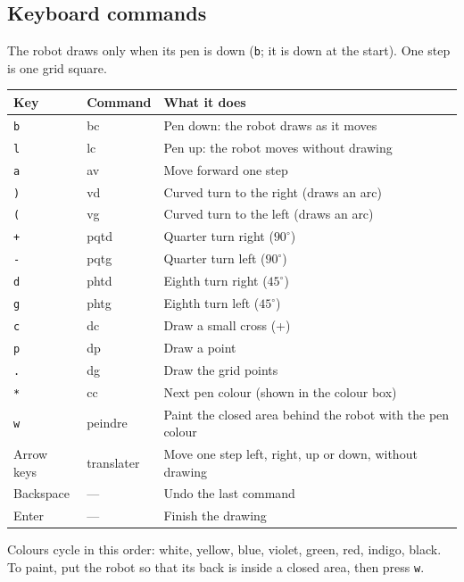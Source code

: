 \documentclass[11pt,a4paper]{article}
\newcommand{\kbd}[1]{\texttt{#1}}
\begin{document}
\subsection{Keyboard commands}
The robot draws only when its pen is down (\kbd{b}; it is down at the
start). One step is one grid square.

\begin{center}
\begin{tabularx}{\linewidth}{@{}l l L@{}}
\toprule
\textbf{Key} & \textbf{Command} & \textbf{What it does} \\
\midrule
\kbd{b} & bc & Pen down: the robot draws as it moves \\
\kbd{l} & lc & Pen up: the robot moves without drawing \\
\kbd{a} & av & Move forward one step \\
\kbd{)} & vd & Curved turn to the right (draws an arc) \\
\kbd{(} & vg & Curved turn to the left (draws an arc) \\
\kbd{+} & pqtd & Quarter turn right ($90^\circ$) \\
\kbd{-} & pqtg & Quarter turn left ($90^\circ$) \\
\kbd{d} & phtd & Eighth turn right ($45^\circ$) \\
\kbd{g} & phtg & Eighth turn left ($45^\circ$) \\
\kbd{c} & dc & Draw a small cross (+) \\
\kbd{p} & dp & Draw a point \\
\kbd{.} & dg & Draw the grid points \\
\kbd{*} & cc & Next pen colour (shown in the colour box) \\
\kbd{w} & peindre & Paint the closed area behind the robot with the pen colour \\
Arrow keys & translater & Move one step left, right, up or down, without drawing \\
Backspace & --- & Undo the last command \\
Enter & --- & Finish the drawing \\
\bottomrule
\end{tabularx}
\end{center}

Colours cycle in this order: white, yellow, blue, violet, green, red,
indigo, black. To paint, put the robot so that its back is inside a closed
area, then press \kbd{w}.
\end{document}
